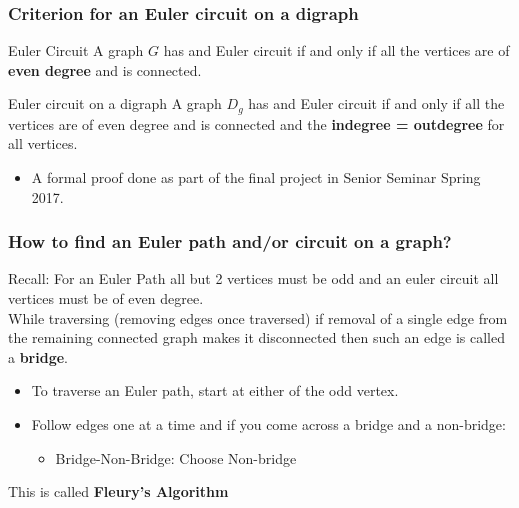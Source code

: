 \documentclass{beamer}
\begin{document}

\begin{frame}
\frametitle{Criterion for an Euler circuit on a digraph}
\begin{block}{Euler Circuit}
A graph $G$ has and Euler circuit if and only if all the vertices are of \textbf{even degree} and is connected. 
\end{block}
\begin{block}{Euler circuit on a digraph}
A graph $D_g$ has and Euler circuit if and only if all the vertices are of
even degree and is connected and the \textbf{indegree = outdegree}
for all vertices.
\end{block}
\begin{itemize}
\item A formal proof done as part of the final project in Senior Seminar Spring 2017.
\end{itemize}
\end{frame}


\begin{frame}
\frametitle{How to find an Euler path and/or circuit on a graph?}
Recall: For an Euler Path all but 2 vertices must be odd and an euler circuit all vertices must be of even degree.
\pause
\\ {\color{red} While traversing (removing edges once traversed) if removal of a single edge from the remaining connected graph makes it disconnected then such an edge is called a \textbf{bridge}.}

\begin{itemize}

\item To traverse an Euler path, start at either of the odd vertex.
\pause
\item Follow edges one at a time and if you come across a bridge and a non-bridge:
\begin{itemize}
\item Bridge-Non-Bridge: Choose Non-bridge
\end{itemize}
\end{itemize}
\pause
This is called \textbf{Fleury's Algorithm}
\end{frame}

\end{document}
